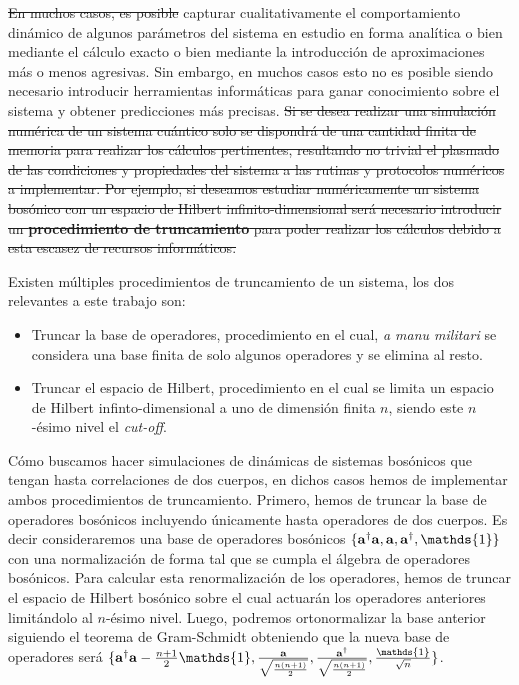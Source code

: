 \begin{Omitir}
\st{En muchos casos, es posible} capturar cualitativamente el comportamiento dinámico de algunos parámetros del sistema en estudio en forma analítica  o bien mediante el cálculo exacto o bien mediante la introducción de aproximaciones más o menos agresivas. Sin embargo, en muchos casos esto no es posible siendo necesario introducir herramientas informáticas para ganar conocimiento sobre el sistema y obtener predicciones más precisas. 
\st{Si se desea realizar una simulaci\'on num\'erica de un sistema cu\'antico solo se dispondr\'a de una cantidad finita de memoria para realizar los c\'alculos pertinentes, resultando no trivial el plasmado de las condiciones y propiedades del sistema a las rutinas y protocolos num\'ericos a implementar. Por ejemplo, si deseamos estudiar num\'ericamente un sistema bos\'onico con un espacio de Hilbert infinito-dimensional será necesario introducir un \textbf{procedimiento de truncamiento} para poder realizar los c\'alculos debido a esta escasez de recursos inform\'aticos. }



Existen múltiples procedimientos de truncamiento de un sistema, los dos relevantes a este trabajo son:

\begin{itemize}
    \item Truncar la base de operadores, procedimiento en el cual, \textit{a manu militari} se considera una base finita de solo algunos operadores y se elimina al resto.
    \item Truncar el espacio de Hilbert, procedimiento en el cual se limita un espacio de Hilbert infinto-dimensional a uno de dimensión finita $n$, siendo este $n$-ésimo nivel el \textit{cut-off}.
\end{itemize}

Cómo buscamos hacer simulaciones de dinámicas de sistemas bosónicos que tengan hasta correlaciones de dos cuerpos, en dichos casos hemos de implementar ambos procedimientos de truncamiento. Primero, hemos de truncar la base de operadores bosónicos incluyendo únicamente hasta operadores de dos cuerpos. Es decir consideraremos una base de operadores bosónicos $\{{\bf a}^{\dagger}{\bf a}, {\bf a}, {\bf a}^{\dagger},\mathds{1}\}$ con una normalización de forma tal que se cumpla el álgebra de operadores bosónicos. Para calcular esta renormalización de los operadores, hemos de truncar el espacio de Hilbert bosónico sobre el cual actuarán los operadores anteriores limitándolo al $n$-ésimo nivel. Luego, podremos ortonormalizar la base anterior siguiendo el teorema de Gram-Schmidt obteniendo que la nueva base de operadores será $\{{\bf a}^{\dagger}{\bf a}-\frac{n+1}{2}\mathds{1}, \frac{{\bf a}}{\sqrt{\frac{n(n+1)}{2}}}, \frac{{\bf a}^{\dagger}}{\sqrt{\frac{n(n+1)}{2}}}, \frac{\mathds{1}}{\sqrt{n}}\}$.
\end{Omitir}